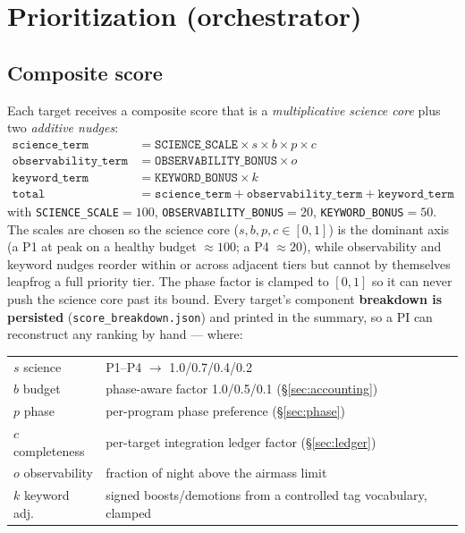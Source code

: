 \documentclass[11pt,letterpaper]{article}
\begin{document}
\section{Prioritization (orchestrator)}
\subsection{Composite score}
Each target receives a composite score that is a \emph{multiplicative science core} plus
two \emph{additive nudges}:
\begin{align}
\texttt{science\_term} &= \texttt{SCIENCE\_SCALE}\times s \times b \times p \times c \\
\texttt{observability\_term} &= \texttt{OBSERVABILITY\_BONUS}\times o \\
\texttt{keyword\_term} &= \texttt{KEYWORD\_BONUS}\times k \\
\texttt{total} &= \texttt{science\_term} + \texttt{observability\_term} + \texttt{keyword\_term}
\end{align}
with \texttt{SCIENCE\_SCALE}$=100$, \texttt{OBSERVABILITY\_BONUS}$=20$,
\texttt{KEYWORD\_BONUS}$=50$. The scales are chosen so the science core ($s,b,p,c\in[0,1]$)
is the dominant axis (a P1 at peak on a healthy budget $\approx100$; a P4 $\approx20$), while
observability and keyword nudges reorder within or across adjacent tiers but cannot by
themselves leapfrog a full priority tier. The phase factor is clamped to $[0,1]$ so it can
never push the science core past its bound. Every target's component \textbf{breakdown is
persisted} (\texttt{score\_breakdown.json}) and printed in the summary, so a PI can
reconstruct any ranking by hand --- where:
\begin{center}
\begin{tabular}{@{}ll@{}}
\toprule
$s$ science & P1--P4 $\rightarrow$ 1.0/0.7/0.4/0.2 \\
$b$ budget & phase-aware factor 1.0/0.5/0.1 (\S\ref{sec:accounting}) \\
$p$ phase & per-program phase preference (\S\ref{sec:phase}) \\
$c$ completeness & per-target integration ledger factor (\S\ref{sec:ledger}) \\
$o$ observability & fraction of night above the airmass limit \\
$k$ keyword adj. & signed boosts/demotions from a controlled tag vocabulary, clamped \\
\bottomrule
\end{tabular}
\end{center}
\end{document}
